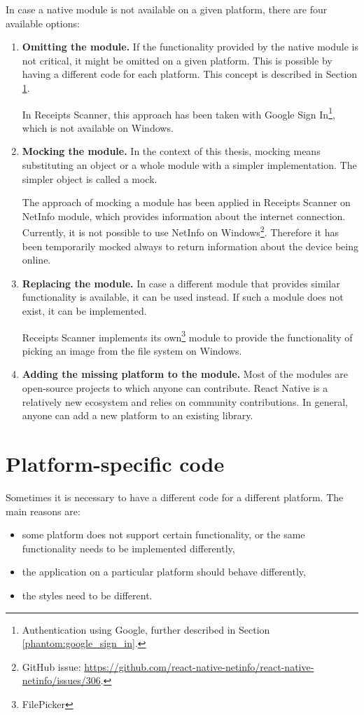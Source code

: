 \documentclass[
  digital, %
  table,   %
  oneside, %
  lof,     %
  lot,     %
]{fithesis3}
\begin{document}
In case a native module is not available on a given platform, there are four available options:
\begin{enumerate}
    \item \textbf{Omitting the module.} 
    If the functionality provided by the native module is not critical, it might be omitted on a given platform. This is possible by having a different code for each platform. This concept is described in Section \ref{sec:platform_specific_code}.
    
    In Receipts Scanner, this approach has been taken with Google Sign In\footnote{Authentication using Google, further described in Section \ref{phantom:google_sign_in}.}, which is not available on Windows.
    
    \item \textbf{Mocking the module.}
    In the context of this thesis, mocking means substituting an object or a whole module with a simpler implementation. The simpler object is called a mock.
    
    The approach of mocking a module has been applied in Receipts Scanner on NetInfo module, which provides information about the internet connection. Currently, it is not possible to use NetInfo on Windows\footnote{GitHub issue: \url{https://github.com/react-native-netinfo/react-native-netinfo/issues/306}.}. Therefore it has been temporarily mocked always to return information about the device being online.
    
    \item \textbf{Replacing the module.} In case a different module that provides similar functionality is available, it can be used instead. If such a module does not exist, it can be implemented.
    
    Receipts Scanner implements its own\footnote{FilePicker} module to provide the functionality of picking an image from the file system on Windows.
    
    \item \textbf{Adding the missing platform to the module.}
    Most of the modules are open-source projects to which anyone can contribute. React Native is a relatively new ecosystem and relies on community contributions. In general, anyone can add a new platform to an existing library.
\end{enumerate}

\section{Platform-specific code}
\label{sec:platform_specific_code}
Sometimes it is necessary to have a different code for a different platform. The main reasons are:
\begin{itemize}
\item some platform does not support certain functionality, or the same functionality needs to be implemented differently,
\item the application on a particular platform should behave differently,
\item the styles need to be different.
\end{itemize}
\end{document}
